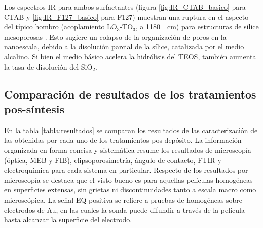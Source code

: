 		 Los espectros IR para ambos surfactantes (figura \ref{fig:IR_CTAB_basico} para CTAB y \ref{fig:IR_F127_basico} para F127) muestran una ruptura en el aspecto del típico hombro (acoplamiento LO$_3$-TO$_3$, a \SI{1180}{\per\cm}) para estructuras de sílice mesoporosas \cite{Olsen1989,Innocenzi2003,Angelome2008}. Esto sugiere un colapso de la organización de poros en la nanoescala, debido a la disolución parcial de la sílice, catalizada por el medio alcalino. Si bien el medio básico acelera la hidrólisis del TEOS, también aumenta la tasa de disolución del SiO$_2$.\cite{Mazer1994,Niibori2000,Gorrepati2010}

	 \subsection{Comparación de resultados de los tratamientos pos-síntesis}
	 		
	 		En la tabla \ref{tabla:resultados} se comparan los resultados de las caracterización de las \pdm\space obtenidas por cada uno de los tratamientos pos-depósito. La información organizada en forma concisa y sistemática resume los resultados de microscopía (óptica, MEB y FIB), elipsoporosimetría, ángulo de contacto, FTIR y electroquímica para cada sistema en particular. Respecto de los resultados por microscopía se destaca que el visto bueno es para aquellas películas homogéneas en superficies extensas, sin grietas ni discontinuidades tanto a escala macro como microscópica. La señal EQ positiva se refiere a pruebas de \pdm\space homogéneas sobre electrodos de Au, en las cuales la sonda puede difundir a través de la película hasta alcanzar la superficie del electrodo.


	 
